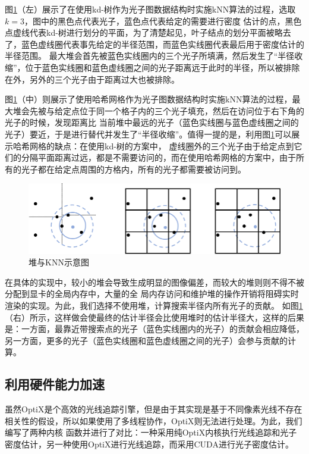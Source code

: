 \documentclass[UTF8]{ctexart}
\begin{document}
        图\ref{fig:6}（左）展示了在使用kd-树作为光子图数据结构时实施kNN算法的过程，选取$k=3$，图中的黑色点代表光子，蓝色点代表给定的需要进行密度
        估计的点，黑色点虚线代表kd-树进行划分的平面，为了清楚起见，叶子结点的划分平面被略去了，蓝色虚线圈代表事先给定的半径范围，而蓝色实线圈代表最后用于密度估计的半径范围。
        最大堆会首先被蓝色实线圈内的三个光子所填满，然后发生了“半径收缩”，位于蓝色实线圈和蓝色虚线圈之间的光子距离远于此时的半径，所以被排除在外，另外的三个光子由于距离过大也被排除。

        图\ref{fig:6}（中）则展示了使用哈希网格作为光子图数据结构时实施kNN算法的过程，最大堆会先被与给定点位于同一个格子内的三个光子填充，然后在访问位于右下角的光子的时候，发现距离比
        当前堆中最远的光子（蓝色实线圈与蓝色虚线圈之间的光子）要近，于是进行替代并发生了“半径收缩”。值得一提的是，利用图\ref{fig:6}可以展示哈希网格的缺点：在使用kd-树的方案中，
        虚线圈外的三个光子由于给定点到它们的分隔平面距离过远，都是不需要访问的，而在使用哈希网格的方案中，由于所有的光子都在给定点周围的方格内，所有的光子都需要被访问到。

        \begin{figure}[H]
        \centering
        \includegraphics[scale=0.8]{pic/KNN.png}
        \caption{堆与KNN示意图}
        \label{fig:6}
        \end{figure}

        在具体的实现中，较小的堆会导致生成明显的图像偏差，而较大的堆则则不得不被分配到显卡的全局内存中，大量的全
        局内存访问和维护堆的操作开销将阻碍实时渲染的实现。为此，我们选择不使用堆，计算搜索半径内所有光子的贡献。
        如图\ref{fig:6}（右）所示，这样做会使最终的估计半径会比使用堆时的估计半径大，这样的后果是：一方面，最靠近带搜索点的光子（蓝色实线圈内的光子）的贡献会相应降低，
        另一方面，更多的光子（蓝色实线圈和蓝色虚线圈之间的光子）会参与贡献的计算。

    \subsection{利用硬件能力加速}
        虽然OptiX是个高效的光线追踪引擎，但是由于其实现是基于不同像素光线不存在相关性的假设，所以如果使用了多线程协作，OptiX则无法进行处理。为此，我们编写了两种内核
        函数并进行了对比：一种采用纯OptiX内核执行光线追踪和光子密度估计，另一种使用OptiX进行光线追踪，而采用CUDA进行光子密度估计。
        
\end{document}

